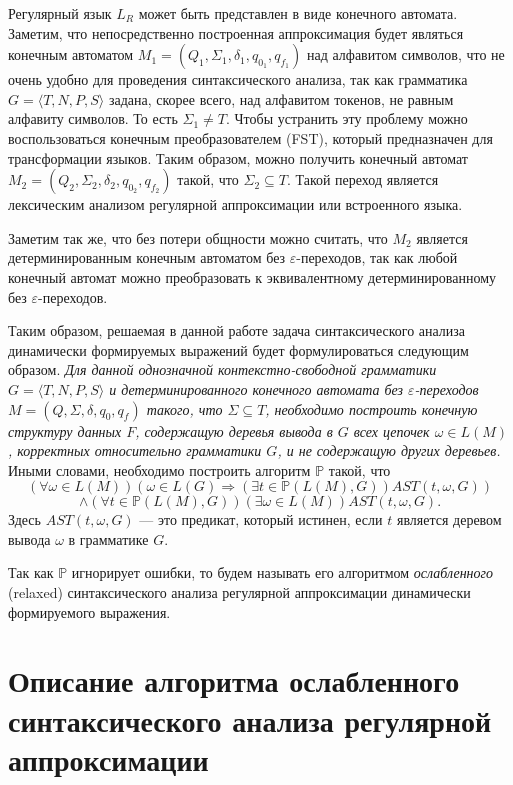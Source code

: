 Регулярный язык $L_R$ может быть представлен в виде конечного автомата. Заметим, что непосредственно построенная аппроксимация будет являться конечным автоматом $M_1=(Q_1,\Sigma_1,\delta_1,q_{0_1},q_{f_1})$ над алфавитом символов, что не очень удобно для проведения синтаксического анализа, так как грамматика $G = \langle T, N, P, S \rangle$ задана, скорее всего, над алфавитом токенов, не равным алфавиту символов. То есть $\Sigma_1 \neq T$. Чтобы устранить эту проблему можно воспользоваться конечным преобразователем (FST), который предназначен для трансформации языков. Таким образом, можно получить конечный автомат $M_2=(Q_2,\Sigma_2,\delta_2,q_{0_2},q_{f_2})$ такой, что $\Sigma_2 \subseteq T$. Такой переход является лексическим анализом регулярной аппроксимации или встроенного языка.

Заметим так же, что без потери общности можно считать, что $M_2$ является детерминированным конечным автоматом без $\varepsilon$-переходов, так как любой конечный автомат можно преобразовать к эквивалентному детерминированному без  $\varepsilon$-переходов.

Таким образом, решаемая в данной работе задача синтаксического анализа динамически формируемых выражений будет формулироваться следующим образом. \textit{ Для данной однозначной контекстно-свободной грамматики $G = \langle T, N, P, S \rangle$ и детерминированного конечного автомата без $\varepsilon$-переходов $M=(Q,\Sigma,\delta,q_0,q_f)$ такого, что $\Sigma \subseteq T$, необходимо построить конечную структуру данных $F$, содержащую деревья вывода в $G$ всех цепочек $\omega \in L(M)$, корректных относительно грамматики $G$, и не содержащую других деревьев. } Иными словами, необходимо построить алгоритм $\mathbb{P}$ такой, что
    $$(\forall \omega \in L(M)) (\omega \in L(G) \Rightarrow (\exists t \in \mathbb{P}(L(M),G))AST(t, \omega, G))$$
    $$\land (\forall t \in \mathbb{P}(L(M),G))(\exists \omega \in L(M))AST(t,\omega,G).$$ 
    Здесь $AST(t,\omega,G)$ --- это предикат, который истинен, если $t$ является деревом вывода $\omega$ в грамматике $G$.


Так как $\mathbb{P}$ игнорирует ошибки, то будем называть его алгоритмом \textit{ослабленного} (relaxed) синтаксического анализа регулярной аппроксимации динамически формируемого выражения.


\section{Описание алгоритма ослабленного синтаксического анализа регулярной аппроксимации}\label{AlgoDescr}

